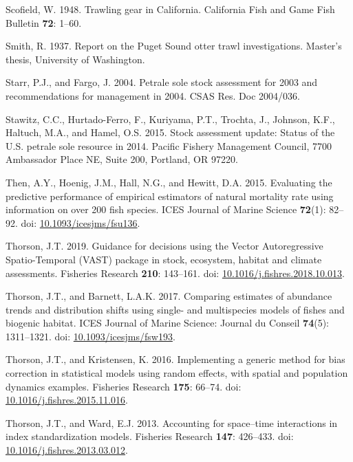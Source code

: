 \documentclass[12pt,]{article}
\begin{document}
\hypertarget{ref-scofield_trawling_1948}{}
Scofield, W. 1948. Trawling gear in California. California Fish and Game
Fish Bulletin \textbf{72}: 1--60.

\hypertarget{ref-smith_report_1937}{}
Smith, R. 1937. Report on the Puget Sound otter trawl investigations.
Master's thesis, University of Washington.

\hypertarget{ref-starr_petrale_2004}{}
Starr, P.J., and Fargo, J. 2004. Petrale sole stock assessment for 2003
and recommendations for management in 2004. CSAS Res. Doc 2004/036.

\hypertarget{ref-stawitz_stock_2015}{}
Stawitz, C.C., Hurtado-Ferro, F., Kuriyama, P.T., Trochta, J., Johnson,
K.F., Haltuch, M.A., and Hamel, O.S. 2015. Stock assessment update:
Status of the U.S. petrale sole resource in 2014. Pacific Fishery
Management Council, 7700 Ambassador Place NE, Suite 200, Portland, OR
97220.

\hypertarget{ref-then_evaluating_2015}{}
Then, A.Y., Hoenig, J.M., Hall, N.G., and Hewitt, D.A. 2015. Evaluating
the predictive performance of empirical estimators of natural mortality
rate using information on over 200 fish species. ICES Journal of Marine
Science \textbf{72}(1): 82--92. doi:
\href{https://doi.org/10.1093/icesjms/fsu136}{10.1093/icesjms/fsu136}.

\hypertarget{ref-thorson_guidance_2019}{}
Thorson, J.T. 2019. Guidance for decisions using the Vector
Autoregressive Spatio-Temporal (VAST) package in stock, ecosystem,
habitat and climate assessments. Fisheries Research \textbf{210}:
143--161. doi:
\href{https://doi.org/10.1016/j.fishres.2018.10.013}{10.1016/j.fishres.2018.10.013}.

\hypertarget{ref-thorson_comparing_2017}{}
Thorson, J.T., and Barnett, L.A.K. 2017. Comparing estimates of
abundance trends and distribution shifts using single- and multispecies
models of fishes and biogenic habitat. ICES Journal of Marine Science:
Journal du Conseil \textbf{74}(5): 1311--1321. doi:
\href{https://doi.org/10.1093/icesjms/fsw193}{10.1093/icesjms/fsw193}.

\hypertarget{ref-thorson_implementing_2016}{}
Thorson, J.T., and Kristensen, K. 2016. Implementing a generic method
for bias correction in statistical models using random effects, with
spatial and population dynamics examples. Fisheries Research
\textbf{175}: 66--74. doi:
\href{https://doi.org/10.1016/j.fishres.2015.11.016}{10.1016/j.fishres.2015.11.016}.

\hypertarget{ref-thorson_accounting_2013}{}
Thorson, J.T., and Ward, E.J. 2013. Accounting for space--time
interactions in index standardization models. Fisheries Research
\textbf{147}: 426--433. doi:
\href{https://doi.org/10.1016/j.fishres.2013.03.012}{10.1016/j.fishres.2013.03.012}.
\end{document}
